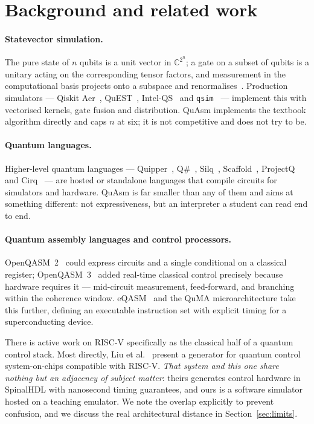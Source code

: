 \documentclass[11pt]{article}
\newcommand{\quasm}{QuAsm}
\begin{document}
\section{Background and related work}
\label{sec:related}

\paragraph{Statevector simulation.} The pure state of $n$ qubits is a unit vector in
$\mathbb{C}^{2^n}$; a gate on a subset of qubits is a unitary acting on the corresponding
tensor factors, and measurement in the computational basis projects onto a subspace and
renormalises~\cite{nielsen}. Production simulators --- Qiskit Aer~\cite{qiskit},
QuEST~\cite{quest}, Intel-QS~\cite{intelqs} and \texttt{qsim}~\cite{qsim} --- implement
this with vectorised kernels, gate fusion and distribution. \quasm{} implements the
textbook algorithm directly and caps $n$ at six; it is not competitive and does not try to
be.

\paragraph{Quantum languages.} Higher-level quantum languages --- Quipper~\cite{quipper},
Q\#~\cite{qsharp}, Silq~\cite{silq}, Scaffold~\cite{scaffcc}, ProjectQ~\cite{projectq} and
Cirq~\cite{cirq} --- are hosted or standalone languages that compile circuits for
simulators and hardware. \quasm{} is far smaller than any of them and aims at something
different: not expressiveness, but an interpreter a student can read end to end.

\paragraph{Quantum assembly languages and control processors.}
OpenQASM~2~\cite{openqasm2} could express circuits and a single conditional on a classical
register; OpenQASM~3~\cite{openqasm3} added real-time classical control precisely because
hardware requires it --- mid-circuit measurement, feed-forward, and branching within the
coherence window. eQASM~\cite{fu2019eqasm} and the QuMA microarchitecture take this
further, defining an executable instruction set with explicit timing for a superconducting
device.

There is active work on RISC-V specifically as the classical half of a quantum control
stack. Most directly, Liu et al.~\cite{liu2025riscq} present a generator for quantum
control system-on-chips compatible with RISC-V. \emph{That system and this one share
nothing but an adjacency of subject matter}: theirs generates control hardware in SpinalHDL
with nanosecond timing guarantees, and ours is a software simulator hosted on a teaching
emulator. We note the overlap explicitly to prevent confusion, and we discuss the real
architectural distance in Section~\ref{sec:limits}.
\end{document}
